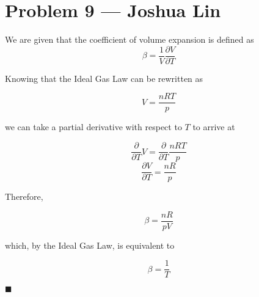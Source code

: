 \documentclass{article}
\begin{document}
\section{Problem 9 --- Joshua Lin}

We are given that the coefficient of volume expansion is defined as 
\[ \beta = \frac{1}{V} \frac{\partial V}{\partial T} \]

Knowing that the Ideal Gas Law can be rewritten as 

\[ V = \frac{nRT}{p} \]

we can take a partial derivative with respect to $T$ to arrive at 

\[ \frac{\partial}{\partial T} V = \frac{\partial}{\partial T}\frac{nRT}{p} \]
\[ \frac{\partial V}{\partial T} = \frac{nR}{p} \]

Therefore, 

\[ \beta = \frac{nR}{pV} \]

which, by the Ideal Gas Law, is equivalent to

\[ \beta = \frac{1}{T} \]

$\blacksquare$
\end{document}
